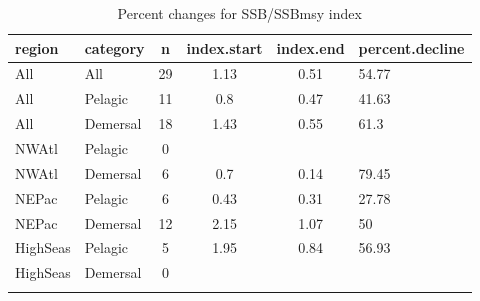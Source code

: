 \begin{longtable}{p{4cm}p{3.5cm}cccp{5.5cm}}
  \hline
region & category & n & index.start & index.end & percent.decline \\ 
  \hline
All & All & 29 & 1.13 & 0.51 & 54.77 \\ 
  All & Pelagic & 11 & 0.8 & 0.47 & 41.63 \\ 
  All & Demersal & 18 & 1.43 & 0.55 & 61.3 \\ 
  NWAtl & Pelagic & 0 &  &  &  \\ 
  NWAtl & Demersal & 6 & 0.7 & 0.14 & 79.45 \\ 
  NEPac & Pelagic & 6 & 0.43 & 0.31 & 27.78 \\ 
  NEPac & Demersal & 12 & 2.15 & 1.07 & 50 \\ 
  HighSeas & Pelagic & 5 & 1.95 & 0.84 & 56.93 \\ 
  HighSeas & Demersal & 0 &  &  &  \\ 
   \hline
\hline
\caption{Percent changes for SSB/SSBmsy index}
\label{tab:brp:perc}
\end{longtable}
